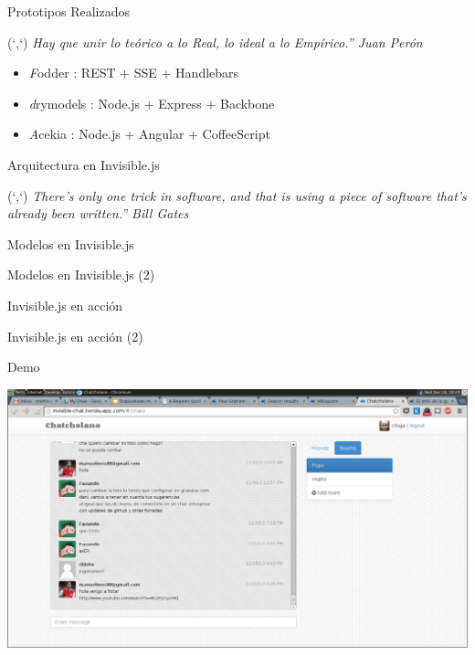 \documentclass[xcolor=dvipsnames, 14pt]{beamer}
\newenvironment{reference}[2]{%
  \begin{textblock*}{\textwidth}(#1,#2)
      \footnotesize\it\bgroup\color{gray!50!black}}{\egroup\end{textblock*}}
\begin{document}
\begin{frame}{Prototipos Realizados}
\begin{reference}{4mm}{85mm}
``Hay que unir lo teórico a lo Real, lo ideal a lo Empírico.'' Juan Perón
\end{reference}

\begin{itemize}
    \item \emph Fodder : REST + SSE + Handlebars
    \item \emph drymodels : Node.js + Express + Backbone
    \item \emph Acekia : Node.js + Angular + CoffeeScript
\end{itemize}
\end{frame}

\begin{frame}{Arquitectura en Invisible.js}
\begin{reference}{4mm}{85mm}
``There's only one trick in software, and that is using a piece of software that's already been written.'' Bill Gates
\end{reference}

\end{frame}

\begin{frame}{Modelos en Invisible.js}

\end{frame}

\begin{frame}{Modelos en Invisible.js (2)}

\end{frame}

\begin{frame}{Invisible.js en acción}

\end{frame}

\begin{frame}{Invisible.js en acción (2)}

\end{frame}

\begin{frame}{Demo}
    \begin{center}
        \includegraphics[width=\textwidth]{img/demo.png}
    \end{center}
\end{frame}
\end{document}

